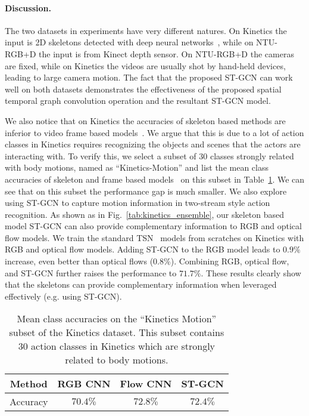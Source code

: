 \documentclass[letterpaper]{article} \usepackage{aaai18}  \usepackage{times}  \usepackage{helvet}  \usepackage{courier}  \usepackage{url}  \usepackage{graphicx}
\begin{document}
\paragraph{Discussion.}
The two datasets in experiments have very different natures. 
On Kinetics the input is 2D skeletons detected with deep neural networks~\cite{Cao2017CVPR}, while on NTU-RGB+D the input is from Kinect depth sensor.
On NTU-RGB+D the cameras are fixed, while on Kinetics the videos are usually shot by hand-held devices, leading to large camera motion.
The fact that the proposed ST-GCN can work well on both datasets demonstrates the effectiveness of the proposed spatial temporal graph convolution operation and the resultant ST-GCN model.

We also notice that on Kinetics the accuracies of skeleton based methods are inferior to video frame based models~\cite{Kay2017Kinetics}. 
We argue that this is due to a lot of action classes in Kinetics requires recognizing the objects and scenes that the actors are interacting with. 
To verify this, we select a subset of $ 30 $ classes strongly related with body motions, named as ``Kinetics-Motion'' and list the mean class accuracies of skeleton and frame based models~\cite{Kay2017Kinetics} on this subset in Table~\ref{tab:kinetics_motion}. 
We can see that on this subset the performance gap is much smaller. 
We also explore using ST-GCN to capture motion information in two-stream style action recognition. 
As shown as in Fig.~\ref{tab:kinetics_ensemble}, our skeleton based model ST-GCN can also provide complementary information to RGB and optical flow models. 
We train the standard TSN~\cite{TSN2016ECCV} models from scratches on Kinetics with RGB and optical flow models. Adding ST-GCN to the RGB model leads to $0.9\%$ increase, even better than optical flows ($0.8\% $).  Combining RGB, optical flow, and ST-GCN further raises the performance to $71.7\%$. 
These results clearly show that the skeletons can provide complementary information when leveraged effectively (e.g. using ST-GCN).


\begin{table}
	\centering
	\begin{tabular}{c|c|c|c}\hline
		Method & RGB CNN & Flow CNN & ST-GCN \\ \hline
		Accuracy & $ 70.4\% $ & $ 72.8\% $ & $72.4\%$ \\ \hline
	\end{tabular}
	\caption{Mean class accuracies on the ``Kinetics Motion'' subset of the Kinetics dataset. This subset contains 
	$ 30 $ action classes in Kinetics which are strongly related to body motions.}\label{tab:kinetics_motion}
\end{table}
\end{document}
